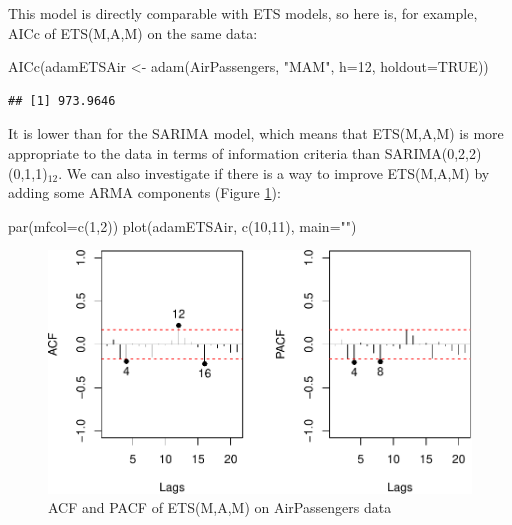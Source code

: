 \documentclass[
]{book}
\newenvironment{Shaded}{\begin{snugshade}}{\end{snugshade}}
\newcommand{\AttributeTok}[1]{\textcolor[rgb]{0.77,0.63,0.00}{#1}}
\newcommand{\ConstantTok}[1]{\textcolor[rgb]{0.00,0.00,0.00}{#1}}
\newcommand{\DecValTok}[1]{\textcolor[rgb]{0.00,0.00,0.81}{#1}}
\newcommand{\FunctionTok}[1]{\textcolor[rgb]{0.00,0.00,0.00}{#1}}
\newcommand{\NormalTok}[1]{#1}
\newcommand{\OtherTok}[1]{\textcolor[rgb]{0.56,0.35,0.01}{#1}}
\newcommand{\StringTok}[1]{\textcolor[rgb]{0.31,0.60,0.02}{#1}}
\theoremstyle{definition}
\theoremstyle{definition}
\theoremstyle{definition}
\theoremstyle{definition}
\theoremstyle{remark}
\begin{document}
This model is directly comparable with ETS models, so here is, for example, AICc of ETS(M,A,M) on the same data:

\begin{Shaded}
\begin{Highlighting}[]
\FunctionTok{AICc}\NormalTok{(adamETSAir }\OtherTok{\textless{}{-}} \FunctionTok{adam}\NormalTok{(AirPassengers, }\StringTok{"MAM"}\NormalTok{,}
                        \AttributeTok{h=}\DecValTok{12}\NormalTok{, }\AttributeTok{holdout=}\ConstantTok{TRUE}\NormalTok{))}
\end{Highlighting}
\end{Shaded}

\begin{verbatim}
## [1] 973.9646
\end{verbatim}

It is lower than for the SARIMA model, which means that ETS(M,A,M) is more appropriate to the data in terms of information criteria than SARIMA(0,2,2)(0,1,1)\(_{12}\). We can also investigate if there is a way to improve ETS(M,A,M) by adding some ARMA components (Figure \ref{fig:adamETSPlotAirACFPACF}):

\begin{Shaded}
\begin{Highlighting}[]
\FunctionTok{par}\NormalTok{(}\AttributeTok{mfcol=}\FunctionTok{c}\NormalTok{(}\DecValTok{1}\NormalTok{,}\DecValTok{2}\NormalTok{))}
\FunctionTok{plot}\NormalTok{(adamETSAir, }\FunctionTok{c}\NormalTok{(}\DecValTok{10}\NormalTok{,}\DecValTok{11}\NormalTok{), }\AttributeTok{main=}\StringTok{""}\NormalTok{)}
\end{Highlighting}
\end{Shaded}

\begin{figure}
\centering
\includegraphics{Svetunkov--2022----ADAM_files/figure-latex/adamETSPlotAirACFPACF-1.pdf}
\caption{\label{fig:adamETSPlotAirACFPACF}ACF and PACF of ETS(M,A,M) on AirPassengers data}
\end{figure}
\end{document}
